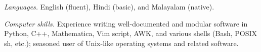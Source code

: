 \documentclass[10pt,article,oneside]{memoir}
\def\email#1{\href{mailto:#1}{#1}}
\begin{document}
\emph{Languages.\enspace} English (fluent), Hindi (basic), and Malayalam (native).

\emph{Computer skills.\enspace} Experience writing well-documented and modular software in Python, C++, Mathematica, Vim script, AWK, and various shells (Bash, POSIX sh, etc.); seasoned user of Unix-like operating systems and related software.





\end{document}
